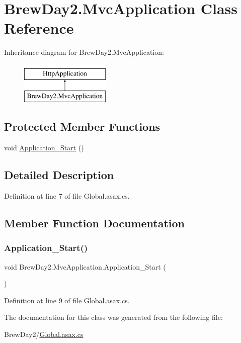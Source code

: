\hypertarget{class_brew_day2_1_1_mvc_application}{}\section{Brew\+Day2.\+Mvc\+Application Class Reference}
\label{class_brew_day2_1_1_mvc_application}
Inheritance diagram for Brew\+Day2.\+Mvc\+Application\+:\begin{figure}[H]
\begin{center}
\leavevmode
\includegraphics[height=2.000000cm]{class_brew_day2_1_1_mvc_application}
\end{center}
\end{figure}
\subsection*{Protected Member Functions}
\begin{DoxyCompactItemize}
\item 
void \mbox{\hyperlink{class_brew_day2_1_1_mvc_application_ae883c620e9c11dd60eed638aeff488da}{Application\+\_\+\+Start}} ()
\end{DoxyCompactItemize}


\subsection{Detailed Description}


Definition at line 7 of file Global.\+asax.\+cs.



\subsection{Member Function Documentation}
\mbox{\label{class_brew_day2_1_1_mvc_application_ae883c620e9c11dd60eed638aeff488da}} 
\subsubsection{\texorpdfstring{Application\+\_\+\+Start()}{Application\_Start()}}
{\footnotesize\ttfamily void Brew\+Day2.\+Mvc\+Application.\+Application\+\_\+\+Start (\begin{DoxyParamCaption}{ }\end{DoxyParamCaption})\hspace{0.3cm}{\ttfamily [protected]}}



Definition at line 9 of file Global.\+asax.\+cs.



The documentation for this class was generated from the following file\+:\begin{DoxyCompactItemize}
\item 
Brew\+Day2/\mbox{\hyperlink{_global_8asax_8cs}{Global.\+asax.\+cs}}\end{DoxyCompactItemize}

